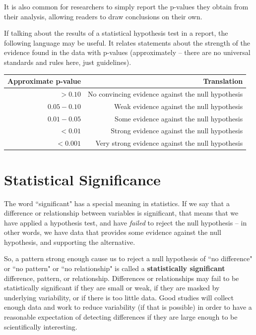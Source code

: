 \documentclass[twoside]{book}\usepackage[]{graphicx}\usepackage[]{xcolor}
\def\term#1{\textbf{#1}}
\begin{document}
It is also common for researchers to simply report the p-values they obtain from their analysis, allowing readers to draw conclusions on their own.

If talking about the results of a statistical hypothesis test in a report, the following language may be useful.  It relates statements about the strength of the evidence found in the data with p-values (approximately -- there are no universal standards and rules here, just guidelines).

\begin{center}
\begin{tabular}{r|r}
Approximate p-value & Translation\\
\hline
$> 0.10$ & No convincing evidence against the null hypothesis\\
$0.05-0.10$ & Weak evidence against the null hypothesis\\
$0.01-0.05$ & Some evidence against the null hypothesis\\
$<0.01$ & Strong evidence against the null hypothesis\\
$<0.001$ & Very strong evidence against the null hypothesis\\
\hline
\end{tabular}
\end{center}

\section{Statistical Significance}
The word ``significant" has a special meaning in statistics.  If we say that a difference or relationship between variables is significant, that means that we have applied a hypothesis test, and have \emph{failed} to reject the null hypothesis -- in other words, we have data that provides some evidence against the null hypothesis, and supporting the alternative.

So, a pattern strong enough cause us to reject a null hypothesis of ``no difference" or ``no pattern" or ``no relationship" is called a \term{statistically significant} difference, pattern, or relationship.  Differences or relationships may fail to be statistically
significant if they are small or weak, if they are masked by underlying variability, or if there is too 
little data.  Good studies will collect enough data and work to reduce variability (if that is possible)
in order to have a reasonable expectation of detecting differences if they are large enough to 
be scientifically interesting.
\end{document}
